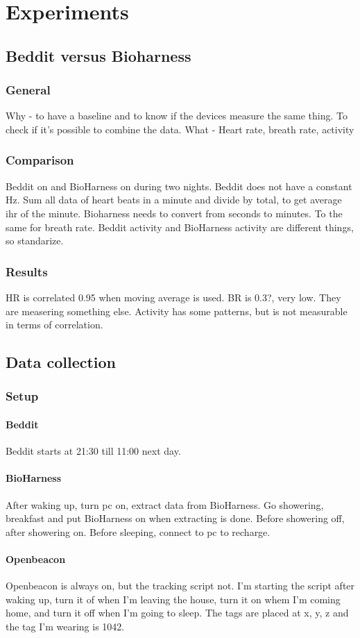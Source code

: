 \section{Experiments}
	\subsection{Beddit versus Bioharness}
		\subsubsection{General}
			Why - to have a baseline and to know if the devices measure the same thing. To check if it's possible to combine the data.
			What - Heart rate, breath rate, activity
		\subsubsection{Comparison}
			Beddit on and BioHarness on during two nights.
			Beddit does not have a constant Hz. Sum all data of heart beats in a minute and divide by total, to get average ihr of the minute. 
			Bioharness needs to convert from seconds to minutes. To the same for breath rate. 
			Beddit activity and BioHarness activity are different things, so standarize.

		\subsubsection{Results}
			HR is correlated 0.95 when moving average is used.
			BR is 0.3?, very low. They are measering something else.
			Activity has some patterns, but is not measurable in terms of correlation.
	\subsection{Data collection}
		\subsubsection{Setup}
			\paragraph{Beddit}
				Beddit starts at 21:30 till 11:00 next day. 
			\paragraph{BioHarness}
				After waking up, turn pc on, extract data from BioHarness. Go showering, breakfast and put BioHarness on when extracting is done. Before showering off, after showering on. Before sleeping, connect to pc to recharge. 
			\paragraph{Openbeacon}
				Openbeacon is always on, but the tracking script not. I'm starting the script after waking up, turn it of when I'm leaving the house, turn it on whem I'm coming home, and turn it off when I'm going to sleep. The tags are placed at x, y, z and the tag I'm wearing is 1042. 
